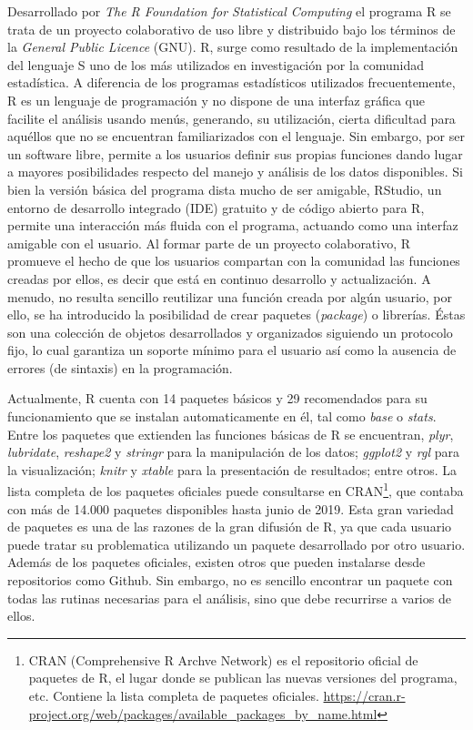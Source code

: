 Desarrollado por \emph{The R Foundation for Statistical Computing} el programa R se trata de un proyecto colaborativo de uso libre y distribuido bajo los términos de la \emph{General Public Licence} (GNU). R, surge como resultado de la implementación del lenguaje S uno de los más utilizados en investigación por la comunidad estadística. A diferencia de los programas estadísticos utilizados frecuentemente, R es un lenguaje de programación y no dispone de una interfaz gráfica que facilite el análisis usando menús, generando, su utilización, cierta dificultad para aquéllos que no se encuentran familiarizados con el lenguaje. Sin embargo,  por ser un software  libre,  permite a los usuarios definir sus propias funciones dando lugar a mayores posibilidades respecto del manejo y análisis de los datos disponibles. Si bien la versión básica del programa dista mucho de ser amigable, RStudio, un entorno de desarrollo integrado (IDE) gratuito y de código abierto para R, permite una interacción más fluida con el programa, actuando como una interfaz amigable con el usuario.  Al formar parte de un proyecto colaborativo, R promueve el hecho de que los usuarios compartan con la comunidad las funciones creadas por ellos, es decir que está en continuo desarrollo y actualización. A menudo, no resulta sencillo reutilizar una función creada por algún usuario, por ello, se ha introducido la posibilidad de crear paquetes (\emph{package}) o librerías. Éstas son una colección de objetos desarrollados y organizados siguiendo un protocolo fijo, lo cual garantiza un soporte mínimo para el usuario así como la ausencia de errores (de sintaxis) en la programación.

Actualmente, R cuenta con 14 paquetes básicos y 29 recomendados para su funcionamiento que se instalan automaticamente en él, tal como \emph{base} o \emph{stats}. Entre los paquetes que extienden las funciones básicas de R se encuentran, \emph{plyr}, \emph{lubridate}, \emph{reshape2} y \emph{stringr} para la manipulación de los datos; \emph{ggplot2} y \emph{rgl} para la visualización; \emph{knitr} y \emph{xtable} para la presentación de resultados; entre otros. La lista completa de los paquetes oficiales puede consultarse en CRAN\footnote{CRAN (Comprehensive R Archve Network) es el repositorio oficial de paquetes de R, el lugar donde se publican las nuevas versiones del programa, etc. Contiene la lista completa de paquetes oficiales. \url{https://cran.r-project.org/web/packages/available_packages_by_name.html}}, que contaba con más de 14.000 paquetes disponibles hasta junio de 2019. Esta gran variedad de paquetes es una de las razones de la gran difusión de R, ya que cada usuario puede tratar su problematica utilizando un paquete desarrollado por otro usuario. Además de los paquetes oficiales, existen otros que pueden instalarse desde repositorios como Github. Sin embargo, no es sencillo encontrar un paquete con todas las rutinas necesarias para el análisis, sino que debe recurrirse a varios de ellos. 

